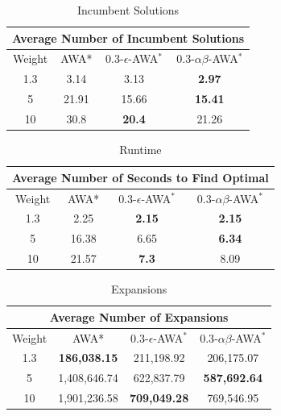 \begin{table}
\def\arraystretch{1.3}
\begin{tabular}{ |c||c|c|c|  }
    \hline
    \multicolumn{4}{|c|}{Average Number of Incumbent Solutions} \\
    \hline
    Weight& AWA* & $0.3$-$\epsilon$-AWA$^*$ & $0.3$-$\alpha\beta$-AWA$^*$\\
    \hline
    1.3 & 3.14 & 3.13 & \textbf{2.97} \\
    \hline
    5 & 21.91 & 15.66 & \textbf{15.41} \\
    \hline
    10& 30.8 & \textbf{20.4} & 21.26 \\
    \hline
\end{tabular}
\caption{Incumbent Solutions}\label{tab:inv-sol}
\end{table}

\begin{table}
\def\arraystretch{1.3}
\begin{tabular}{ |c||c|c|c|  }
    \hline
    \multicolumn{4}{|c|}{Average Number of Seconds to Find Optimal} \\
    \hline
    Weight& AWA* & $0.3$-$\epsilon$-AWA$^*$ & $0.3$-$\alpha\beta$-AWA$^*$\\
    \hline
    1.3 & 2.25 & \textbf{2.15} & \textbf{2.15} \\
    \hline
    5 & 16.38 & 6.65 & \textbf{6.34} \\
    \hline
    10& 21.57 & \textbf{7.3} & 8.09 \\
    \hline
\end{tabular}
\caption{Runtime}\label{tab:inv-avg-time}
\end{table}

\begin{table}
\def\arraystretch{1.3}
\begin{tabular}{ |c||c|c|c|  }
    \hline
    \multicolumn{4}{|c|}{Average Number of Expansions} \\
    \hline
    Weight& AWA* & $0.3$-$\epsilon$-AWA$^*$ & $0.3$-$\alpha\beta$-AWA$^*$\\
    \hline
    1.3 & \textbf{186,038.15} & 211,198.92 & 206,175.07 \\
    \hline
    5 & 1,408,646.74 & 622,837.79 & \textbf{587,692.64} \\
    \hline
    10& 1,901,236.58 & \textbf{709,049.28} & 769,546.95 \\
    \hline
\end{tabular}
\caption{Expansions}\label{tab:inv-avg-exp}
\end{table}

